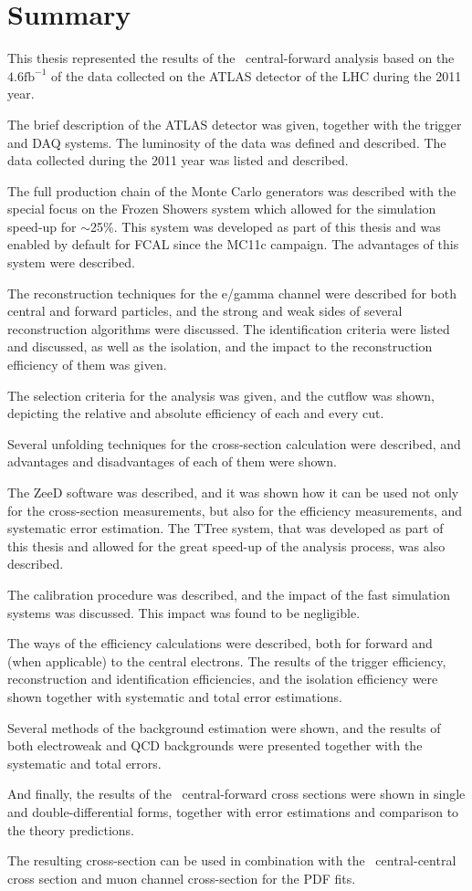 \chapter{Summary}
\label{sec:Summary}

This thesis represented the results of the \Zee\ central-forward analysis based on the $4.6 \mathrm{fb}^{-1}$ of the data collected on the ATLAS detector of the LHC during the 2011 year.

The brief description of the ATLAS detector was given, together with the trigger and DAQ systems. The luminosity of the data was defined and described. The data collected during the 2011 year was listed and described.

The full production chain of the Monte Carlo generators was described with the special focus on the Frozen Showers system which allowed for the simulation speed-up for $\sim$25\%. This system was developed as part of this thesis and was enabled by default for FCAL since the MC11c campaign. The advantages of this system were described.

The reconstruction techniques for the e/gamma  channel were described for both central and forward particles, and the strong and weak sides of several reconstruction algorithms were discussed. The identification criteria were listed and discussed, as well as the isolation, and the impact to the reconstruction efficiency of them was given.

The selection criteria for the analysis was given, and the cutflow was shown, depicting the relative and absolute efficiency of each and every cut.

Several unfolding techniques for the cross-section calculation were described, and advantages and disadvantages of each of them were shown.

The ZeeD software was described, and it was shown how it can be used not only for the cross-section measurements, but also for the efficiency measurements, and systematic error estimation. The TTree system, that was developed as part of this thesis and allowed for the great speed-up of the analysis process, was also described.

The calibration procedure was described, and the impact of the fast simulation systems was discussed. This impact was found to be negligible.

The ways of the efficiency calculations were described, both for forward and (when applicable) to the central electrons. The results of the trigger efficiency, reconstruction and identification efficiencies, and the isolation efficiency were shown together with systematic and total error estimations.

Several methods of the background estimation were shown, and the results of both electroweak and QCD backgrounds were presented together with the systematic and total errors.

And finally, the results of the \Zee\ central-forward cross sections were shown in single and double-differential forms, together with error estimations and comparison to the theory predictions.

The resulting cross-section can be used in combination with the \Zee\ central-central cross section and muon channel cross-section for the PDF fits.
